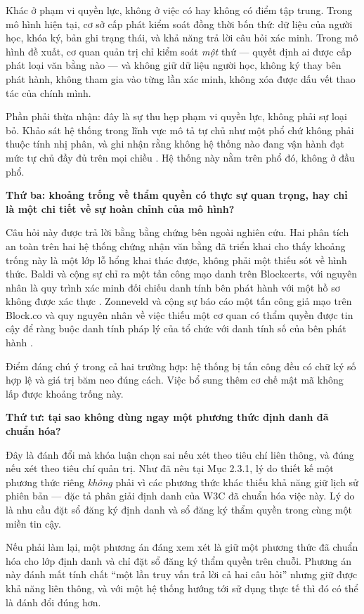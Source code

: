 Khác ở phạm vi quyền lực, không ở việc có hay không có điểm tập trung. Trong mô hình hiện tại, cơ sở cấp phát kiểm soát đồng thời bốn thứ: dữ liệu của người học, khóa ký, bản ghi trạng thái, và khả năng trả lời câu hỏi xác minh. Trong mô hình đề xuất, cơ quan quản trị chỉ kiểm soát \emph{một} thứ --- quyết định ai được cấp phát loại văn bằng nào --- và không giữ dữ liệu người học, không ký thay bên phát hành, không tham gia vào từng lần xác minh, không xóa được dấu vết thao tác của chính mình.

Phần phải thừa nhận: đây là sự thu hẹp phạm vi quyền lực, không phải sự loại bỏ. Khảo sát hệ thống trong lĩnh vực mô tả tự chủ như một phổ chứ không phải thuộc tính nhị phân, và ghi nhận rằng không hệ thống nào đang vận hành đạt mức tự chủ đầy đủ trên mọi chiều \cite{Ambati2026}. Hệ thống này nằm trên phổ đó, không ở đầu phổ.

\noindent \textbf{Thứ ba: khoảng trống về thẩm quyền có thực sự quan trọng, hay chỉ là một chi tiết về sự hoàn chỉnh của mô hình?}

Câu hỏi này được trả lời bằng bằng chứng bên ngoài nghiên cứu. Hai phân tích an toàn trên hai hệ thống chứng nhận văn bằng đã triển khai cho thấy khoảng trống này là một lớp lỗ hổng khai thác được, không phải một thiếu sót về hình thức. Baldi và cộng sự chỉ ra một tấn công mạo danh trên Blockcerts, với nguyên nhân là quy trình xác minh đối chiếu danh tính bên phát hành với một hồ sơ không được xác thực \cite{Baldi2019}. Zonneveld và cộng sự báo cáo một tấn công giả mạo trên Block.co và quy nguyên nhân về việc thiếu một cơ quan có thẩm quyền được tin cậy để ràng buộc danh tính pháp lý của tổ chức với danh tính số của bên phát hành \cite{Zonneveld2026}.

Điểm đáng chú ý trong cả hai trường hợp: hệ thống bị tấn công đều có chữ ký số hợp lệ và giá trị băm neo đúng cách. Việc bổ sung thêm cơ chế mật mã không lấp được khoảng trống này.

\noindent \textbf{Thứ tư: tại sao không dùng ngay một phương thức định danh đã chuẩn hóa?}

Đây là đánh đổi mà khóa luận chọn sai nếu xét theo tiêu chí liên thông, và đúng nếu xét theo tiêu chí quản trị. Như đã nêu tại Mục 2.3.1, lý do thiết kế một phương thức riêng \emph{không} phải vì các phương thức khác thiếu khả năng giữ lịch sử phiên bản --- đặc tả phân giải định danh của W3C đã chuẩn hóa việc này. Lý do là nhu cầu đặt sổ đăng ký định danh và sổ đăng ký thẩm quyền trong cùng một miền tin cậy.

Nếu phải làm lại, một phương án đáng xem xét là giữ một phương thức đã chuẩn hóa cho lớp định danh và chỉ đặt sổ đăng ký thẩm quyền trên chuỗi. Phương án này đánh mất tính chất {``}một lần truy vấn trả lời cả hai câu hỏi{''} nhưng giữ được khả năng liên thông, và với một hệ thống hướng tới sử dụng thực tế thì đó có thể là đánh đổi đúng hơn.

